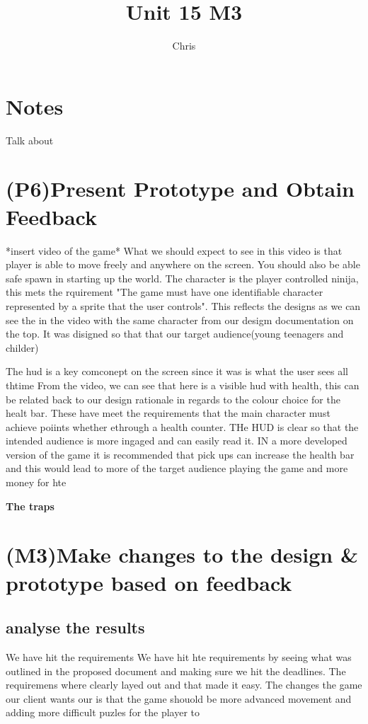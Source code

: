 \documentclass{article}
\begin{document}
\title{Unit 15 M3}
\author{Chris}
\date{}
\maketitle

\section{Notes}
Talk about 


\section{(P6)Present Prototype and Obtain Feedback}
*insert video of the game*
What we should expect to see in this video is that player is able to move freely and anywhere on the screen. You should also be able safe spawn in starting up the world.
The character is the player controlled ninija, this mets the rquirement "The game must have one identifiable character represented by a sprite that the user controls". This reflects the designs as we can see the in the video with the same character from our desigm documentation on the top. It was disigned so that that our target audience(young teenagers and childer)

The hud is a key comconept on the screen since it was is what the user sees all thtime
From the video, we can see that here is a visible hud with health, this can be related back to our design rationale in regards to the colour choice for the healt bar. These have meet the requirements that the main character must achieve poiints whether ethrough a health counter. THe HUD is clear so that the intended audience is more ingaged and can easily read it. IN a more developed version of the game it is recommended that pick ups can increase the health bar and this would lead to more of the target audience playing the game and more money for hte 

\textbf{The traps}



\section{(M3)Make changes to the design \& prototype based on feedback}

\subsection{analyse the results}
We have hit the requirements 
We have hit hte requirements by seeing what was outlined in the proposed document and making sure we hit the deadlines. The requiremens where clearly layed out and that made it easy.
The changes the game our client wants our is that the game shouold be more advanced movement and adding more difficult puzles for the player to 
\end{document}
